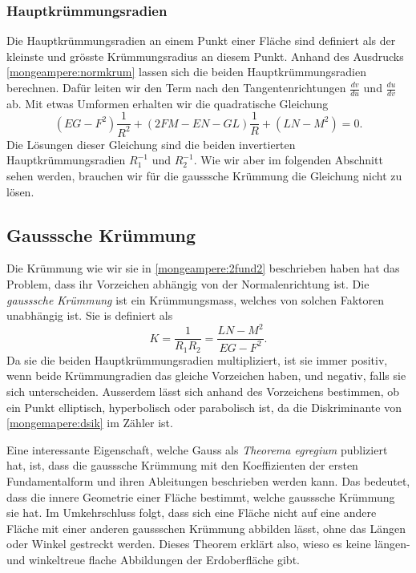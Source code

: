 \subsubsection{Hauptkrümmungsradien}
Die Hauptkrümmungsradien an einem Punkt einer Fläche sind definiert als der kleinste und grösste Krümmungsradius an diesem Punkt.
Anhand des Ausdrucks \eqref{mongeampere:normkrum} lassen sich die beiden Hauptkrümmungsradien berechnen.
Dafür leiten wir den Term nach den Tangentenrichtungen $\frac{d v}{d u}$ und $\frac{d u}{d v}$ ab.
Mit etwas Umformen erhalten wir die quadratische Gleichung
\begin{equation}
  (EG - F^2)\frac{1}{R^2} + (2FM - EN - GL)\frac{1}{R} + (LN-M^2) = 0.
  \label{mongeampere:mainkrum}
\end{equation}
Die Lösungen dieser Gleichung sind die beiden invertierten Hauptkrümmungsradien $R_1^{-1}$ und $R_2^{-1}$.
Wie wir aber im folgenden Abschnitt sehen werden, brauchen wir für die gausssche Krümmung die Gleichung nicht 
zu lösen.

\subsection{Gausssche Krümmung}
Die Krümmung wie wir sie in \eqref{mongeampere:2fund2} beschrieben haben hat das Problem, dass
ihr Vorzeichen abhängig von der Normalenrichtung ist.
Die \emph{gausssche Krümmung} ist ein Krümmungsmass, welches von solchen Faktoren unabhängig ist.
%
Sie is definiert als 
\begin{equation}
  K = \frac{1}{R_1 R_2} = \frac{LN-M^2}{EG-F^2}.
  \label{mongeampere:gausskrumm}
\end{equation}
Da sie die beiden Hauptkrümmungsradien multipliziert, ist sie immer positiv, wenn 
beide Krümmungradien das gleiche Vorzeichen haben, und negativ, falls sie sich unterscheiden.
Ausserdem lässt sich anhand des Vorzeichens bestimmen, ob ein Punkt elliptisch, hyperbolisch oder parabolisch 
ist, da die Diskriminante von \eqref{mongemapere:dsik} im Zähler ist.

Eine interessante Eigenschaft, welche Gauss als \emph{Theorema egregium} publiziert hat, ist, dass
%
die gausssche Krümmung mit den Koeffizienten der ersten Fundamentalform und ihren Ableitungen beschrieben werden kann.
Das bedeutet, dass die innere Geometrie einer Fläche bestimmt, welche gausssche Krümmung sie hat.
Im Umkehrschluss folgt, dass sich eine Fläche nicht auf eine andere Fläche mit einer anderen gaussschen Krümmung abbilden
lässt, ohne das Längen oder Winkel gestreckt werden.
Dieses Theorem erklärt also, wieso es keine längen- und winkeltreue flache Abbildungen der Erdoberfläche gibt.

